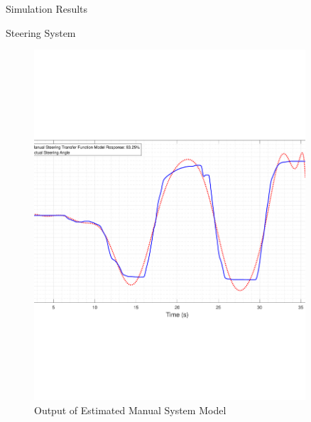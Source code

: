 \documentclass{beamer}
\begin{document}
\begin{frame}{Simulation Results}
\begin{block}{Steering System}
\begin{figure}
\begin{minipage}{0.45\textwidth}
        \includegraphics[width=0.9\textwidth]{figs/img/manualSteeringTransferFunctionModel} %
        \caption{Output of Estimated Manual System Model}
        \label{fig:manualSteerModel}
    \end{minipage}
\end{figure}
  \end{block}
\end{frame}
\end{document}
